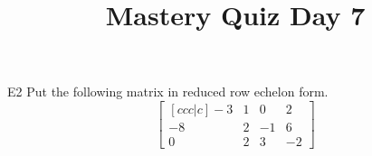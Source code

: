 \documentclass{sbgLAquiz}
\title{Mastery Quiz Day 7 }
\begin{document}
\begin{problem}{E2}
Put the following matrix in reduced row echelon form.
$$\begin{bmatrix}[ccc|c] -3 & 1 & 0 & 2 \\ -8 & 2 & -1 & 6 \\ 0 & 2 & 3 & -2 \end{bmatrix}$$
\end{problem}
\end{document}
